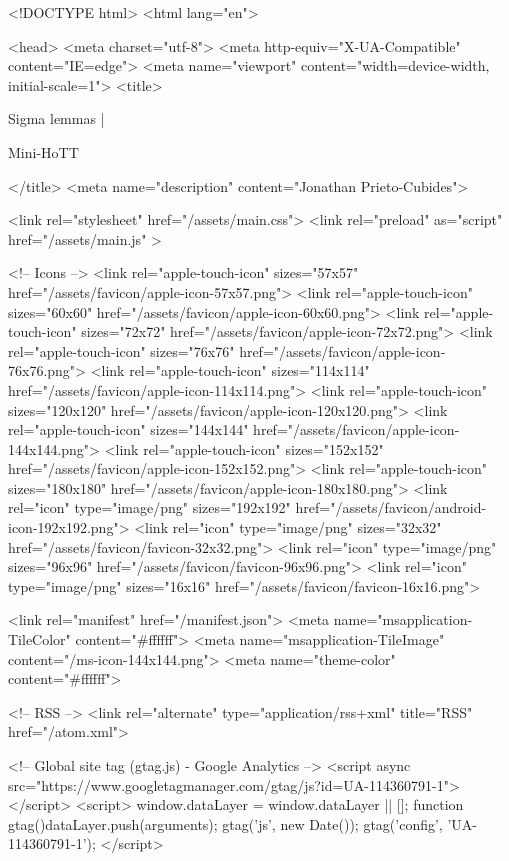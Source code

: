 <!DOCTYPE html>
<html lang="en">

<head>
  <meta charset="utf-8">
  <meta http-equiv="X-UA-Compatible" content="IE=edge">
  <meta name="viewport" content="width=device-width, initial-scale=1">
  <title>
    
      
        Sigma lemmas |
      
        Mini-HoTT
    
  </title>
  <meta name="description" content="Jonathan Prieto-Cubides">

  <link rel="stylesheet" href="/assets/main.css">
  <link rel="preload" as="script" href="/assets/main.js" >

  <!-- Icons -->
  <link rel="apple-touch-icon" sizes="57x57" href="/assets/favicon/apple-icon-57x57.png">
  <link rel="apple-touch-icon" sizes="60x60" href="/assets/favicon/apple-icon-60x60.png">
  <link rel="apple-touch-icon" sizes="72x72" href="/assets/favicon/apple-icon-72x72.png">
  <link rel="apple-touch-icon" sizes="76x76" href="/assets/favicon/apple-icon-76x76.png">
  <link rel="apple-touch-icon" sizes="114x114" href="/assets/favicon/apple-icon-114x114.png">
  <link rel="apple-touch-icon" sizes="120x120" href="/assets/favicon/apple-icon-120x120.png">
  <link rel="apple-touch-icon" sizes="144x144" href="/assets/favicon/apple-icon-144x144.png">
  <link rel="apple-touch-icon" sizes="152x152" href="/assets/favicon/apple-icon-152x152.png">
  <link rel="apple-touch-icon" sizes="180x180" href="/assets/favicon/apple-icon-180x180.png">
  <link rel="icon" type="image/png" sizes="192x192"  href="/assets/favicon/android-icon-192x192.png">
  <link rel="icon" type="image/png" sizes="32x32" href="/assets/favicon/favicon-32x32.png">
  <link rel="icon" type="image/png" sizes="96x96" href="/assets/favicon/favicon-96x96.png">
  <link rel="icon" type="image/png" sizes="16x16" href="/assets/favicon/favicon-16x16.png">

  <link rel="manifest" href="/manifest.json">
  <meta name="msapplication-TileColor" content="#ffffff">
  <meta name="msapplication-TileImage" content="/ms-icon-144x144.png">
  <meta name="theme-color" content="#ffffff">

  <!-- RSS -->
  <link rel="alternate" type="application/rss+xml" title="RSS" href="/atom.xml">

  <!-- Global site tag (gtag.js) - Google Analytics -->
  <script async src="https://www.googletagmanager.com/gtag/js?id=UA-114360791-1"></script>
  <script>
    window.dataLayer = window.dataLayer || [];
    function gtag(){dataLayer.push(arguments);}
    gtag('js', new Date());
    gtag('config', 'UA-114360791-1');
  </script>

